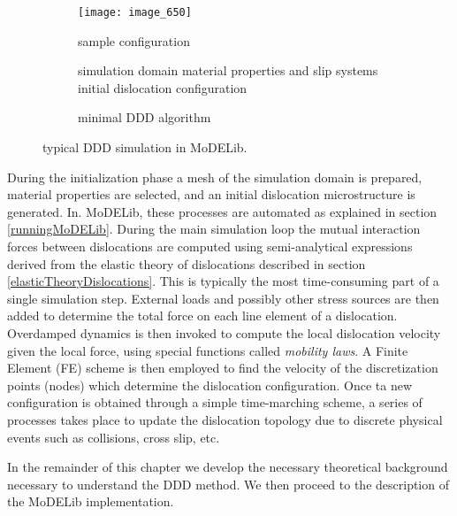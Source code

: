  \begin{figure}[h]
 \centering
  \begin{subfigure}{.48\textwidth}
 \texttt{[image: image\_650]}
 \caption{sample configuration}
  \label{DDDnutshellA}
\end{subfigure}
  \begin{subfigure}{.48\textwidth}
\begin{algorithm}[H]
\MyInit{}
 {
simulation domain\;
material properties and slip systems\;
initial dislocation configuration\;
 }
\end{algorithm}
 \caption{minimal DDD algorithm}
     \label{DDDnutshellB}
\end{subfigure}
  \caption{typical  DDD simulation in MoDELib. }
    \label{DDDnutshell}
 \end{figure}
 
 During the initialization phase a mesh of the simulation domain is prepared, material properties are selected, and an initial dislocation microstructure is generated. In. MoDELib, these processes are automated as explained in section \ref{runningMoDELib}. During the main simulation loop the mutual interaction forces between dislocations are computed using semi-analytical expressions derived from the elastic theory of dislocations described in section \ref{elasticTheoryDislocations}. This is typically the most time-consuming part of a single simulation step. External loads and possibly other stress sources are then added to determine the total force on each line element of a dislocation. Overdamped dynamics is then invoked to compute the local dislocation velocity given the local force, using special functions called \textit{mobility laws}. A Finite Element (FE) scheme is then employed to find the velocity of the discretization points (nodes) which determine the dislocation configuration. Once ta new configuration is obtained through a simple time-marching scheme, a series of processes takes place to update the dislocation topology due to discrete physical events such as collisions, cross slip, etc.

In the remainder of this chapter we develop the necessary theoretical background necessary to understand the  DDD method. We then proceed to the description of the MoDELib implementation. 

